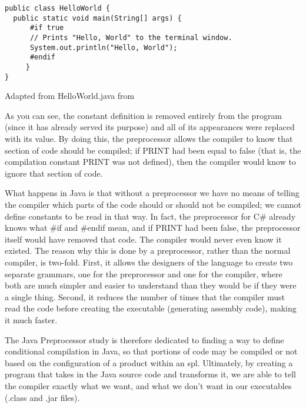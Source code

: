 \begin{listing}
\begin{verbatim}
public class HelloWorld {
  public static void main(String[] args) {
      #if true
      // Prints "Hello, World" to the terminal window.
      System.out.println("Hello, World");
      #endif
     }
}
\end{verbatim}
\caption{Adapted from HelloWorld.java from \cite{SEDGEWICK:2011}} \label{lst:helloworldjavaconditional2}
\end{listing}

As you can see, the constant definition is removed entirely from the program (since it has already served its purpose) and all of its appearances were replaced with its value. By doing this, the preprocessor allows the compiler to know that section of code should be compiled; if PRINT had been equal to false (that is, the compilation constant PRINT was not defined), then the compiler would know to ignore that section of code.

What happens in Java is that without a preprocessor we have no means of telling the compiler which parts of the code should or should not be compiled; we cannot define constants to be read in that way. In fact, the preprocessor for C\# already knows what \#if and \#endif mean, and if PRINT had been false, the preprocessor itself would have removed that code. The compiler would never even know it existed. The reason why this is done by a preprocessor, rather than the normal compiler, is two-fold. First, it allows the designers of the language to create two separate \gls{grammar}s, one for the preprocessor and one for the compiler, where both are much simpler and easier to understand than they would be if they were a single thing. Second, it reduces the number of times that the compiler must read the code before creating the executable (generating assembly code), making it much faster.

The Java Preprocessor study is therefore dedicated to finding a way to define conditional compilation in Java, so that portions of code may be compiled or not based on the configuration of a product within an \acrshort{spl}. Ultimately, by creating a program that takes in the Java source code and transforms it, we are able to tell the compiler exactly what we want, and what we don't want in our executables (.class and .jar files).

